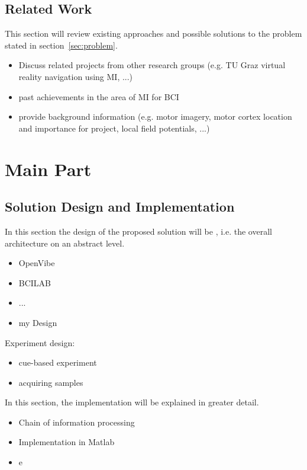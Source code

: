 \documentclass[a4paper,twoside, openright,12pt]{report}
\begin{document}
\section{Related Work}
This section will review existing approaches and possible solutions to the problem stated in section~\ref{sec:problem}.
\begin{itemize}
	\item Discuss related projects from other research groups (e.g. TU Graz virtual reality navigation using MI, ...)
	\item past achievements in the area of MI for BCI
	\item provide background information (e.g. motor imagery, motor cortex location and importance for project, local field potentials, ...)
\end{itemize}




\chapter{Main Part}

\section{Solution Design and Implementation}
In this section the design of the proposed solution will be , i.e. the overall architecture on an abstract level. 

\begin{itemize}
	\item OpenVibe
	\item BCILAB
	\item ... 
	\item my Design
\end{itemize}

Experiment design:
\begin{itemize}
	\item cue-based experiment
	\item acquiring samples 
\end{itemize}

In this section, the implementation will be explained in greater detail. 
\begin{itemize}
	\item Chain of information processing
	\item Implementation in Matlab
	\item e
\end{itemize}
\end{document}
